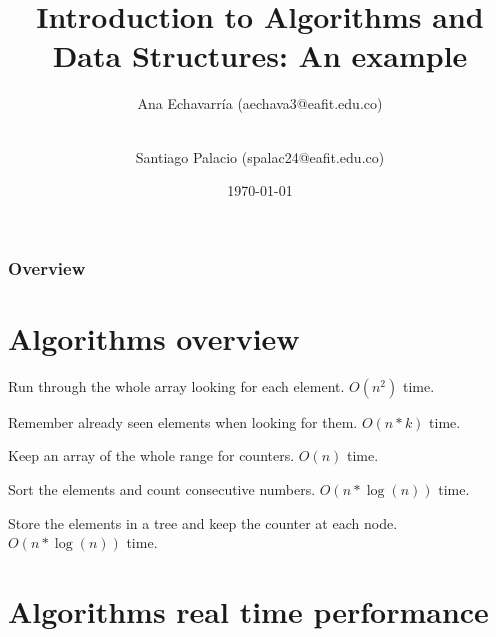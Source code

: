 \documentclass[table]{beamer}
\title[Algorithms and Data Structures]{Introduction to Algorithms and Data Structures: An example} %
\author[A. Echavarr\'ia \and S. Palacio]{Ana Echavarr\'ia (aechava3@eafit.edu.co) \and\\ Santiago Palacio (spalac24@eafit.edu.co)} %
\institute[EAFIT] %
{
EAFIT University \\ %
\medskip
}
\date{\today} %
\begin{document}

\begin{frame}
\titlepage
\end{frame}

\begin{frame}
\frametitle{Overview}
\tableofcontents
\end{frame}

\section{Algorithms overview}
\frame{\tableofcontents[currentsection]}

\begin{frame}
    \begin{description}
        \setlength\itemsep{10pt}
        \item[Naive] Run through the whole array looking for each element. $O(n^2)$ time.
        \item[DP] Remember already seen elements when looking for them. $O(n * k)$ time.
        \item[Counting] Keep an array of the whole range for counters. $O(n)$ time.
        \item[Sorting] Sort the elements and count consecutive numbers. $O(n*\log(n))$ time.
        \item[Tree] Store the elements in a tree and keep the counter at each node. $O(n*\log(n))$ time.
    \end{description}
\end{frame}

\section{Algorithms real time performance}
\frame{\tableofcontents[currentsection]}
\end{document}
